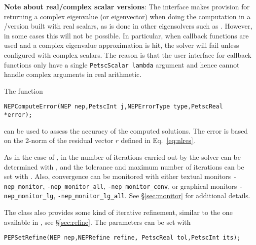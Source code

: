 \textbf{Note about real/complex scalar versions}: The interface makes provision for returning a complex eigenvalue (or eigenvector) when doing the computation in a \petsc/\slepc version built with real scalars, as is done in other eigensolvers such as . However, in some cases this will not be possible. In particular, when callback functions are used and a complex eigenvalue approximation is hit, the solver will fail unless configured with complex scalars. The reason is that the user interface for callback functions only have a single \texttt{PetscScalar lambda} argument and hence cannot handle complex arguments in real arithmetic.

\medskip

The function
	\begin{Verbatim}[fontsize=\small]
	NEPComputeError(NEP nep,PetscInt j,NEPErrorType type,PetscReal *error);
	\end{Verbatim}
can be used to assess the accuracy of the computed solutions. The error is based on the 2-norm of the residual vector $r$ defined in Eq.\ \ref{eq:nlres}.

As in the case of , in  the number of iterations carried out by the solver can be determined with , and the tolerance and maximum number of iterations can be set with . Also, convergence can be monitored with either textual monitors \Verb!-nep_monitor!, \Verb!-nep_monitor_all!, \Verb!-nep_monitor_conv!, or graphical monitors \Verb!-nep_monitor_lg!, \Verb!-nep_monitor_lg_all!. See \S\ref{sec:monitor} for additional details.

The  class also provides some kind of iterative refinement, similar to the one available in , see \S\ref{sec:refine}. The parameters can be set with
	\begin{Verbatim}[fontsize=\small]
	PEPSetRefine(NEP nep,NEPRefine refine, PetscReal tol,PetscInt its);
	\end{Verbatim}


